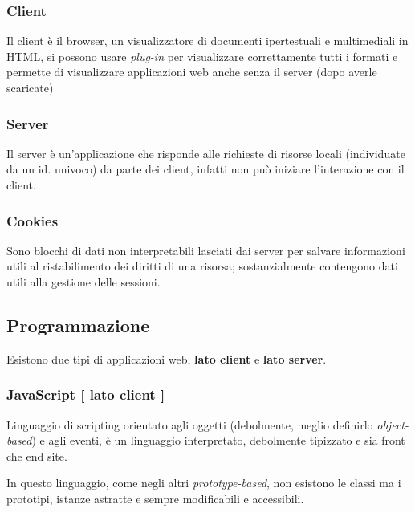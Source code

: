 \subsubsection{Client}\label{client}

Il client è il browser, un visualizzatore di documenti ipertestuali e
multimediali in HTML, si possono usare \emph{plug-in} per visualizzare
correttamente tutti i formati e permette di visualizzare applicazioni
web anche senza il server (dopo averle scaricate)

\subsubsection{Server}\label{server}

Il server è un'applicazione che risponde alle richieste di risorse
locali (individuate da un id. univoco) da parte dei client, infatti non
può iniziare l'interazione con il client.

\subsubsection{Cookies}\label{cookies}

Sono blocchi di dati non interpretabili lasciati dai server per salvare
informazioni utili al ristabilimento dei diritti di una risorsa;
sostanzialmente contengono dati utili alla gestione delle sessioni.

\subsection{Programmazione}\label{programmazione}

Esistono due tipi di applicazioni web, \textbf{lato client} e
\textbf{lato server}.

\subsubsection{\texorpdfstring{JavaScript {[} lato client {]}
}{JavaScript {[} lato client {]} }}\label{javascript-lato-client}

Linguaggio di scripting orientato agli oggetti (debolmente, meglio
definirlo \emph{object-based}) e agli eventi, è un linguaggio
interpretato, debolmente tipizzato e sia front che end site.

In questo linguaggio, come negli altri \emph{prototype-based}, non
esistono le classi ma i prototipi, istanze astratte e sempre
modificabili e accessibili.

